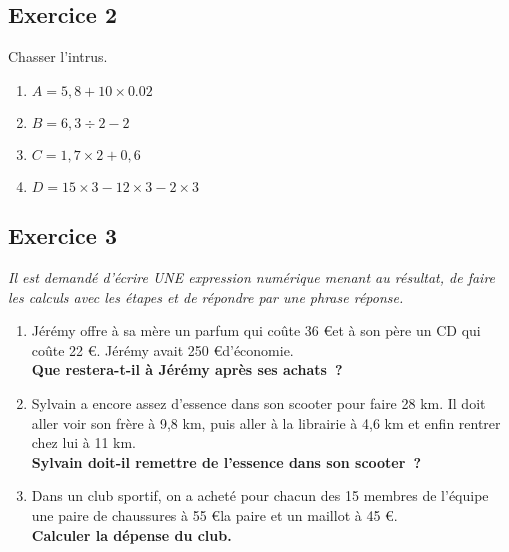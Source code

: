 \documentclass[12pt]{article}
\begin{document}
\subsection*{Exercice 2}
Chasser l'intrus.


\begin{multicols}{2}

\begin{enumerate}
\item $A = 5,8 + 10 \times 0.02$
\item $B = 6,3 \div 2 - 2$
\item $C = 1,7 \times 2 + 0,6$
\item $D = 15 \times 3 - 12 \times 3 - 2 \times 3$
\end{enumerate}

\end{multicols}

\subsection*{Exercice 3}

\textit{Il est demandé d'écrire UNE expression numérique menant au résultat, de faire les calculs avec les étapes et de répondre par une phrase réponse.}

\begin{enumerate}

\item Jérémy offre à sa mère un parfum qui coûte 36 \euro et à son père un CD qui coûte 22 \euro. Jérémy avait 250 \euro d'économie.\\ \textbf{Que restera-t-il à Jérémy après ses achats ?}

\item Sylvain a encore assez d'essence dans son scooter pour faire 28 km. Il doit aller voir son frère à 9,8 km, puis aller à la librairie à 4,6 km et enfin rentrer chez lui à 11 km.\\ \textbf{Sylvain doit-il remettre de l'essence dans son scooter ?}

\item Dans un club sportif, on a acheté pour chacun des 15 membres de l'équipe une paire de chaussures à 55 \euro la paire et un maillot à 45 \euro.\\ \textbf{Calculer la dépense du club.}

\end{enumerate}
\end{document}
